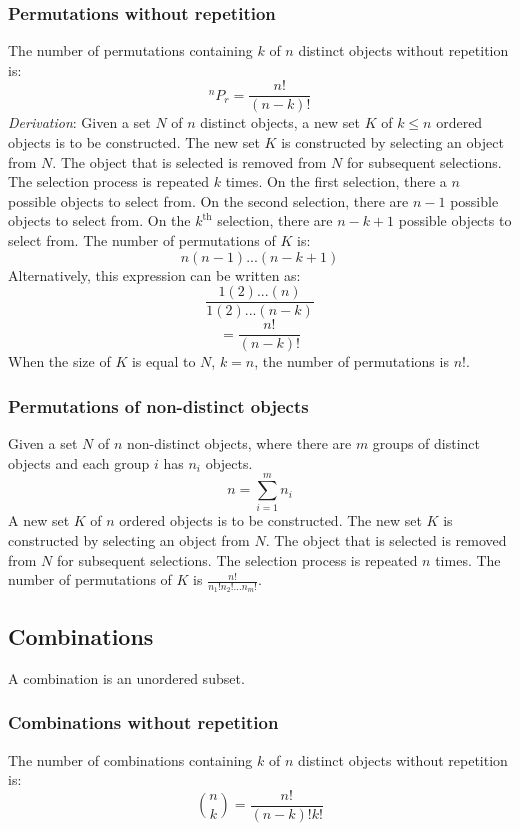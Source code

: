 \documentclass{article}
\begin{document}
\subsubsection{Permutations without repetition}

The number of permutations containing $k$ of $n$ distinct objects without repetition is:
\[^n P_r = \frac{n!}{(n-k)!}\]
\textit{Derivation}: Given a set $N$ of $n$ distinct objects, a new set $K$ of $k \leq n$ ordered objects is to be constructed. The new set $K$ is constructed by selecting an object from $N$. The object that is selected is removed from $N$ for subsequent selections. The selection process is repeated $k$ times. On the first selection, there a $n$ possible objects to select from. On the second selection, there are $n-1$ possible objects to select from. On the $k^{\mathrm{th}}$ selection, there are $n-k+1$ possible objects to select from. The number of permutations of $K$ is:
\[n(n-1)...(n-k+1)\]
Alternatively, this expression can be written as:
\[\frac{1(2)...(n)}{1(2)...(n-k)}\]
\[=\frac{n!}{(n-k)!}\]
When the size of $K$ is equal to $N$, $k=n$, the number of permutations is $n!$.

\subsubsection{Permutations of non-distinct objects}

Given a set $N$ of $n$ non-distinct objects, where there are $m$ groups of distinct objects and each group $i$ has $n_i$ objects.
\[n=\sum_{i=1}^m n_i\]
A new set $K$ of $n$ ordered objects is to be constructed. The new set $K$ is constructed by selecting an object from $N$. The object that is selected is removed from $N$ for subsequent selections. The selection process is repeated $n$ times. The number of permutations of $K$ is $\frac{n!}{n_1!n_2!...n_m!}$.

\subsection{Combinations}

A combination is an unordered subset.

\subsubsection{Combinations without repetition}

The number of combinations containing $k$ of $n$ distinct objects without repetition is:
\[\binom{n}{k}=\frac{n!}{(n-k)!k!}\]
\end{document}
